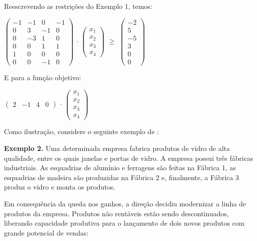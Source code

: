 Reescrevendo as restrições do Exemplo 1, temos:

\begin{center}
$\begin{pmatrix} 
-1 & -1 & 0  & -1 \\ 
 0 &  3 & -1 &  0 \\
 0 & -3 &  1 &  0 \\
 0 &  0 &  1 &  1 \\
 1 &  0 &  0 &  0 \\
 0 &  0 & -1 &  0 
\end{pmatrix}$ 
$\cdot $ 
$\begin{pmatrix} x_1 \\ x_2 \\ x_3 \\ x_4\end{pmatrix}$ 
$\geq$
$\begin{pmatrix} -2 \\ 5 \\ -5\\ 3 \\ 0 \\ 0\end{pmatrix}$
\end{center}

E para a função objetivo:

\begin{center}
$\begin{pmatrix} 2 & -1 & 4 & 0\end{pmatrix}$
$\cdot $ 
$\begin{pmatrix} x_1 \\ x_2 \\ x_3 \\ x_4\end{pmatrix}$ 
\end{center}

Como ilustração, considere o seguinte exemplo de :

	\textbf{Exemplo 2.} Uma determinada empresa fabrica produtos de vidro de alta qualidade, entre os quais janelas e portas de vidro. A empresa possui três fábricas industriais. As esquadrias de alumínio e ferragens são feitas na Fábrica 1, as esquadrias de madeira são produzidas na Fábrica 2 e, finalmente, a Fábrica 3 produz o vidro e monta os produtos. 

Em consequência da queda nos ganhos, a direção decidiu modernizar a linha de produtos da empresa. Produtos não rentáveis estão sendo descontinuados, liberando capacidade produtiva para o lançamento de dois novos produtos com grande potencial de vendas:

